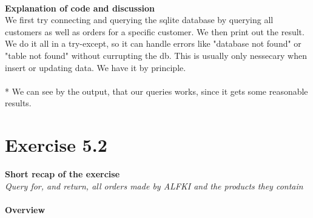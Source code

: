 \documentclass{article}
\begin{document}
~\\
\textbf{Explanation of code and discussion}\\
We first try connecting and querying the sqlite database by querying all customers as well as orders for a specific customer. We then print out the result. 
We do it all in a try-except, so it can handle errors like "database not found" or "table not found" without  currupting the db. This is usually only nessecary when insert or updating data. We have it by principle. \\
\\*
We can see by the output, that our queries works, since it gets some reasonable results. 


\section{Exercise 5.2}
\textbf{Short recap of the exercise}\\
\textit{Query for, and return, all orders made by ALFKI and the products they contain}\\
~\\
\textbf{Overview}
\end{document}
